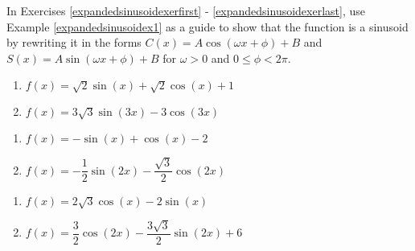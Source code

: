 In Exercises \ref{expandedsinusoidexerfirst} - \ref{expandedsinusoidexerlast}, use Example \ref{expandedsinusoidex1} as a guide to show that the function is a sinusoid by rewriting it in the forms $C(x) = A \cos(\omega x + \phi) + B$ and $S(x) = A \sin(\omega x + \phi) + B$ for $\omega > 0$ and $0 \leq \phi < 2\pi$.

\begin{multicols}{2}

\begin{enumerate}

\setcounter{enumi}{\value{HW}}

\item $f(x) = \sqrt{2}\sin(x) + \sqrt{2}\cos(x) + 1$ \label{expandedsinusoidexerfirst}
\item $f(x) = 3\sqrt{3}\sin(3x) - 3\cos(3x)$

\setcounter{HW}{\value{enumi}}

\end{enumerate}

\end{multicols}

\begin{multicols}{2}

\begin{enumerate}

\setcounter{enumi}{\value{HW}}

\item $f(x) = -\sin(x) + \cos(x) - 2$  
\item $f(x) = -\dfrac{1}{2}\sin(2x) - \dfrac{\sqrt{3}}{2}\cos(2x)$

\setcounter{HW}{\value{enumi}}

\end{enumerate}

\end{multicols}

\begin{multicols}{2}

\begin{enumerate}

\setcounter{enumi}{\value{HW}}

\item  $f(x) = 2\sqrt{3} \cos(x) - 2\sin(x)$  
\item  $f(x) = \dfrac{3}{2} \cos(2x) - \dfrac{3\sqrt{3}}{2} \sin(2x) + 6$

\setcounter{HW}{\value{enumi}}

\end{enumerate}

\end{multicols}

